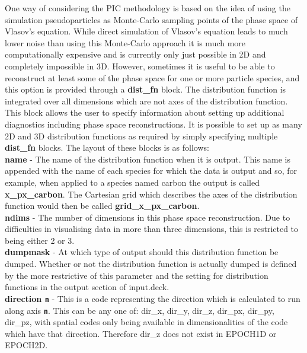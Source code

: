 \documentclass[12pt,a4paper]{article}
\newcommand{\emphtext}{\color{warwickdark} \fontfamily{phv}\selectfont\Large\bf}
\newcommand{\inlinecode}[1]{{\color{warwickred} \bf\texttt{#1}}}
\newcommand{\inlineemph}[1]{{\color{warwicklight} \bf{#1}}}
\begin{document}
One way of considering the PIC methodology is based on the idea of using the
simulation pseudoparticles as Monte-Carlo sampling points of the phase space
of Vlasov's equation. While direct simulation of Vlasov's equation leads to
much lower noise than using this Monte-Carlo approach it is much more
computationally expensive and is currently only just possible in 2D and
completely impossible in 3D. However, sometimes it is useful to be able to
reconstruct at least some of the phase space for one or more particle species,
and this option is provided through a \inlineemph{dist\_fn} block. The
distribution function is integrated over all dimensions which are not axes of
the distribution function.\\

This block allows the user to specify information about
setting up additional diagnostics including phase space reconstructions. It is
possible to set up as many 2D and 3D distribution functions as required by
simply specifying multiple \inlineemph{dist\_fn} blocks. The layout of these
blocks is as follows:\\

{\emphtext name} - The name of the distribution function when it is
output. This name is appended with the name of each species for which the data
is output and so, for example, when applied to a species named
carbon the output is called \inlineemph{x\_px\_carbon}. The Cartesian grid
which describes the axes of the distribution function would then be called
\inlineemph{grid\_x\_px\_carbon}.\\

{\emphtext ndims} - The number of dimensions in this phase space
reconstruction. Due to difficulties in visualising data in more than three
dimensions, this is restricted to being either 2 or 3.\\

{\emphtext dumpmask} - At which type of output should this distribution
function be dumped. Whether or not the distribution function is actually
dumped is defined by the more restrictive of this parameter and the setting for
distribution functions in the output section of input.deck.\\

{\emphtext direction\inlinecode{n}} - This is a code representing the direction
which is calculated to run along axis \inlinecode{n}. This can be any one of:
dir\_x, dir\_y, dir\_z, dir\_px, dir\_py, dir\_pz, with spatial codes only
being available in dimensionalities of the code which have that
direction. Therefore dir\_z does not exist in EPOCH1D or EPOCH2D.\\
\end{document}

